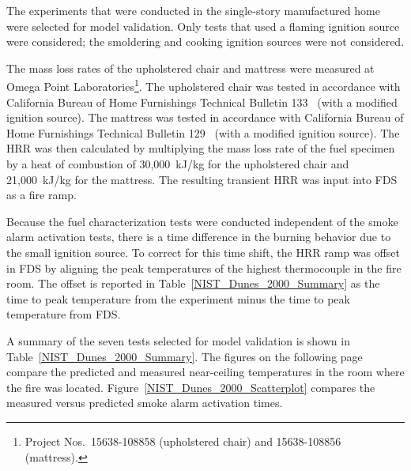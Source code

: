 The experiments that were conducted in the single-story manufactured home were selected for model validation.
Only tests that used a flaming ignition source were considered; the smoldering and cooking ignition sources
were not considered.

The mass loss rates of the upholstered chair and mattress were measured at Omega Point
Laboratories\footnote{Project Nos.~15638-108858 (upholstered chair) and 15638-108856 (mattress).}.
The upholstered chair was tested in accordance with California Bureau of Home Furnishings Technical
Bulletin 133~\cite{CALTB133} (with a modified ignition source). The mattress was tested in accordance
with California Bureau of Home Furnishings Technical Bulletin 129~\cite{CALTB129} (with a modified ignition source).
The HRR was then calculated by multiplying the mass loss rate of the fuel specimen by a heat of combustion of
30,000~kJ/kg for the upholstered chair and 21,000~kJ/kg for the mattress. The resulting transient HRR was
input into FDS as a fire ramp.

Because the fuel characterization tests were conducted independent of the
smoke alarm activation tests, there is a time difference in the burning behavior due to the small ignition
source. To correct for this time shift, the HRR ramp was offset in FDS by aligning the peak temperatures
of the highest thermocouple in the fire room. The offset is reported in Table~\ref{NIST_Dunes_2000_Summary}
as the time to peak temperature from the experiment minus the time to peak temperature from FDS.

A summary of the seven tests selected for model validation is shown in Table~\ref{NIST_Dunes_2000_Summary}.
The figures on the following page compare the predicted and measured near-ceiling temperatures in the room
where the fire was located. Figure~\ref{NIST_Dunes_2000_Scatterplot} compares the measured versus predicted
smoke alarm activation times.

